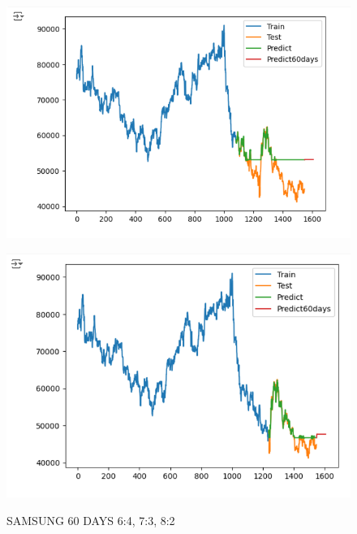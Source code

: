 \documentclass{article}
\begin{document}
\begin{multicols}{2}
\begin{figure}[H]
\begin{minipage}{0.15\textwidth}
    \label{fig:1}
    \end{minipage}%
    \begin{minipage}{0.15\textwidth}
    \centering
    \includegraphics[width=1\textwidth]{Image/GradientBoosting/SAMSUNG_60_7_3_GradientBoostingRegressor.png}
  
    \label{fig:2}
    \end{minipage}%
    \begin{minipage}{0.15\textwidth}
    \centering
    \includegraphics[width=1\textwidth]{Image/GradientBoosting/SAMSUNG_60_8_2_GradientBoostingRegressor.png}

    \label{fig:3}
    \end{minipage}
    \caption{SAMSUNG 60 DAYS  6:4, 7:3, 8:2 }
\end{figure}


\end{multicols}
\end{document}

